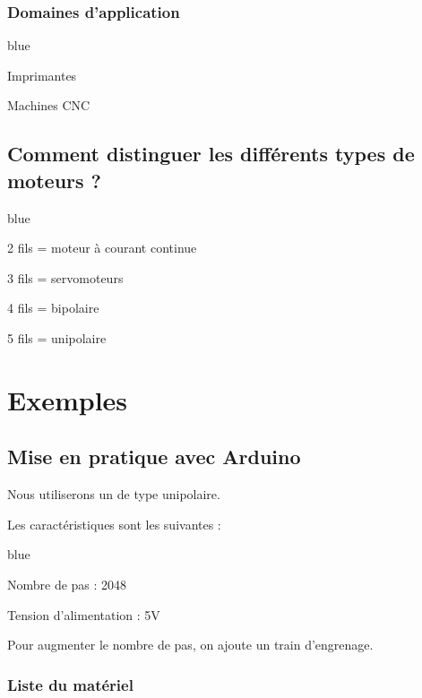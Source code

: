 \subsection{Domaines d'application}

\begin{items}{blue}{\Bullet}
    \item Imprimantes
    \item Machines CNC
\end{items}


\section{Comment distinguer les différents types de moteurs ?}


\begin{items}{blue}{\Bullet}
  \item 2 fils = moteur à courant continue
  \item 3 fils = servomoteurs
  \item 4 fils = \pap bipolaire
  \item 5 fils = \pap unipolaire
\end{items}


\chapter{Exemples}

\section{Mise en pratique avec Arduino} 

Nous utiliserons un \pap {} de type unipolaire. 


Les caractéristiques sont les suivantes : 
\begin{items}{blue}{\Bullet}
  \item Nombre de pas : 2048
  \item Tension d'alimentation : 5V
\end{items}

Pour augmenter le nombre de pas, on ajoute un train d'engrenage.

\subsection{Liste du matériel}

